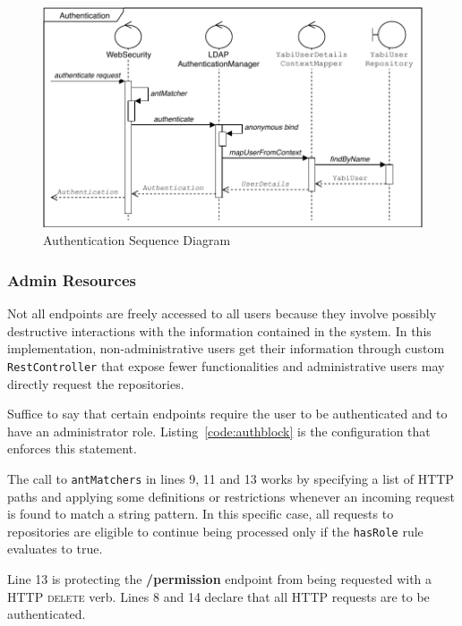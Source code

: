 \begin{figure}
  \centering
  \includegraphics[width=.9\textwidth]{images/diagramas/authentication}
  \caption{Authentication Sequence Diagram}\label{fig:authseq}
\end{figure}


\subsubsection{Admin Resources}\label{impl:admres}
Not all endpoints are freely accessed to all users because they involve possibly destructive interactions with the information contained in the system. In this implementation, non-administrative users get their information through custom \texttt{RestController} that expose fewer functionalities and administrative users may directly request the repositories.

Suffice to say that certain endpoints require the user to be authenticated and to have an administrator role. Listing~\ref{code:authblock} is the configuration that enforces this statement.

The call to \texttt{antMatchers} in lines 9, 11 and 13 works by specifying a list of \gls{HTTP} paths and applying some definitions or restrictions whenever an incoming request is found to match a string pattern. In this specific case, all requests to repositories are eligible to continue being processed only if the \texttt{hasRole} rule evaluates to true.

Line 13 is protecting the \textbf{/permission} endpoint from being requested with a \gls{HTTP} \textsc{delete} verb.
Lines 8 and 14 declare that all \gls{HTTP} requests are to be authenticated.



